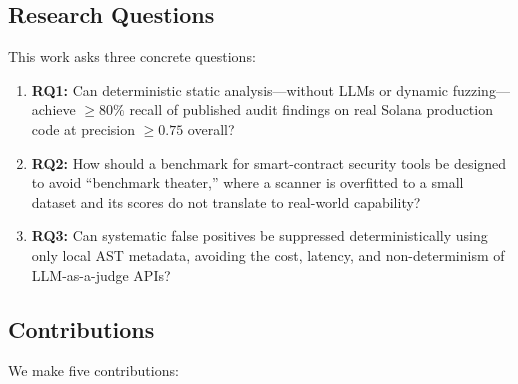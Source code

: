 \documentclass{article}
\begin{document}
\subsection{Research Questions}
\label{sec:rq}

This work asks three concrete questions:

\begin{enumerate}
  \item \textbf{RQ1:} Can deterministic static analysis---without LLMs or dynamic fuzzing---achieve $\geq80\%$ recall of published audit findings on real Solana production code at precision $\geq0.75$ overall?
  \item \textbf{RQ2:} How should a benchmark for smart-contract security tools be designed to avoid ``benchmark theater,'' where a scanner is overfitted to a small dataset and its scores do not translate to real-world capability?
  \item \textbf{RQ3:} Can systematic false positives be suppressed deterministically using only local AST metadata, avoiding the cost, latency, and non-determinism of LLM-as-a-judge APIs?
\end{enumerate}

\subsection{Contributions}
\label{sec:contrib}

We make five contributions:
\end{document}
